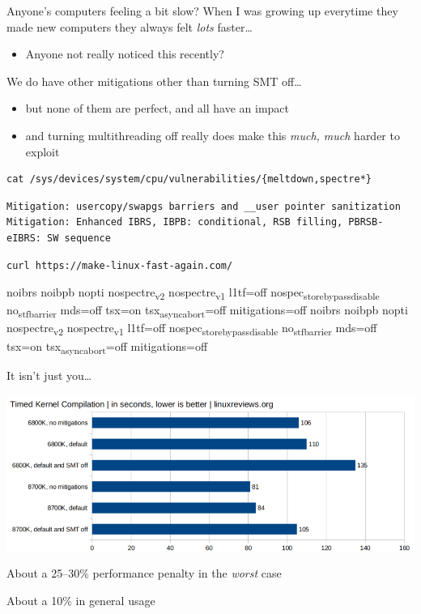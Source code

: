 \documentclass[9pt,aspectratio=169]{beamer}
\begin{document}
\begin{frame}[label={sec:orgc096649},fragile]{Anyone's computers feeling a bit slow?}
 When I was growing up everytime they made new computers they always felt \emph{lots} faster\ldots{}
\begin{itemize}
\item Anyone not really noticed this recently?
\end{itemize}

We do have other mitigations other than turning SMT off\ldots{}
\begin{itemize}
\item but none of them are perfect, and all have an impact
\item and turning multithreading off really does make this \emph{much, much} harder to exploit
\end{itemize}

\begin{verbatim}
cat /sys/devices/system/cpu/vulnerabilities/{meltdown,spectre*}
\end{verbatim}

\begin{verbatim}
Mitigation: usercopy/swapgs barriers and __user pointer sanitization
Mitigation: Enhanced IBRS, IBPB: conditional, RSB filling, PBRSB-eIBRS: SW sequence
\end{verbatim}

\begin{verbatim}
curl https://make-linux-fast-again.com/
\end{verbatim}

noibrs noibpb nopti nospectre\textsubscript{v2} nospectre\textsubscript{v1} l1tf=off nospec\textsubscript{store}\textsubscript{bypass}\textsubscript{disable} no\textsubscript{stf}\textsubscript{barrier} mds=off tsx=on tsx\textsubscript{async}\textsubscript{abort}=off mitigations=off
noibrs noibpb nopti nospectre\textsubscript{v2} nospectre\textsubscript{v1} l1tf=off nospec\textsubscript{store}\textsubscript{bypass}\textsubscript{disable} no\textsubscript{stf}\textsubscript{barrier} mds=off tsx=on tsx\textsubscript{async}\textsubscript{abort}=off mitigations=off
\end{frame}

\begin{frame}[label={sec:org57842bc}]{It isn't just you\ldots{}}
\begin{center}
\includegraphics[width=.9\linewidth]{./performance.png}
\end{center}

About a 25--30\% performance penalty in the \emph{worst} case

About a 10\% in general usage
\end{frame}
\end{document}
